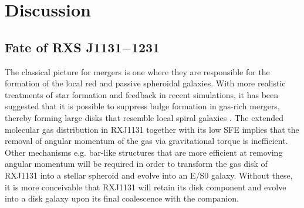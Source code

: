 \documentclass[]{emulateapj}
\begin{document}
\section{Discussion} \label{sec:diss}
\subsection{Fate of RXS J1131$-$1231}
The classical picture for mergers is one where they are responsible for the formation of the local
red and passive spheroidal galaxies.
With more realistic treatments of star formation and feedback in recent simulations,
it has been suggested that it is possible to suppress bulge formation
in gas-rich mergers, thereby forming large disks 
that resemble local spiral galaxies \citep{Springel05a, Robertson06a, Hopkins09a}.
%
%
The extended molecular gas distribution in RXJ1131 together with its low SFE implies that the 
removal of angular momentum of the gas via gravitational torque is inefficient.
Other mechanisms e.g. bar-like structures that are more efficient at removing angular momentum will 
be required in order to transform the gas disk of RXJ1131 into a stellar spheroid and evolve into 
an E/S0 galaxy. Without these, it is more conceivable that RXJ1131 will retain its disk component and
evolve into a disk galaxy upon its final coalescence with the companion.
\end{document}
